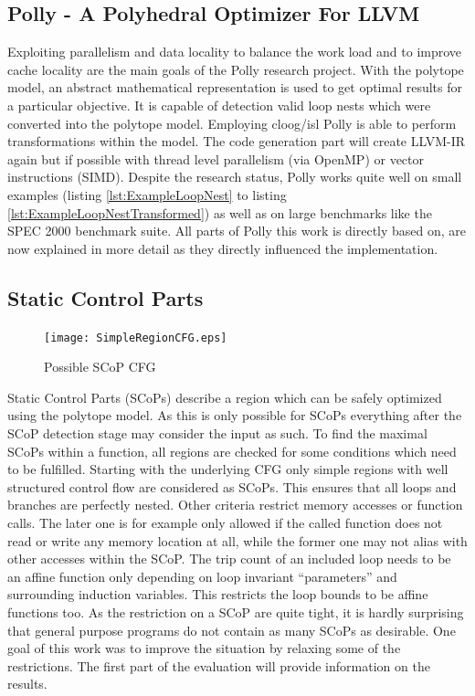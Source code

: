 \orange
\begin{shaded}
\section{Polly - A Polyhedral Optimizer For LLVM}
\label{Polly}
Exploiting parallelism and data locality to balance the work load and to improve
cache locality are the main goals of the Polly research project. With the 
polytope model, an abstract mathematical representation is used to get optimal
results for a particular objective. It is capable of detection valid loop nests 
which were converted into the polytope model. Employing cloog/isl Polly is able to
perform transformations within the model. The code generation part will create 
LLVM-IR again but if possible with thread level parallelism (via OpenMP) or 
vector instructions (SIMD). Despite the research status, Polly works quite well 
on small examples (listing \ref{lst:ExampleLoopNest} to listing 
\ref{lst:ExampleLoopNestTransformed}) as well as on large benchmarks like the
SPEC 2000 benchmark suite. All parts of Polly this work is directly based on, 
are now explained in more detail as they directly influenced the implementation. 


\subsection{Static Control Parts}
\begin{figure}
  \centering
  \vspace*{-3mm}
  \texttt{[image: SimpleRegionCFG.eps]}
  \caption{Possible SCoP CFG}
  \label{fig:PossibleSCoPCFG}  
\end{figure}
Static Control Parts (SCoPs) describe a region which can be safely optimized 
using the polytope model. As this is only possible for SCoPs everything after
the SCoP detection stage may consider the input as such. 
To find the maximal SCoPs within a function, 
all regions are checked for some conditions which need to be fulfilled. 
Starting with the underlying CFG only simple regions with well structured
control flow are considered as SCoPs. This ensures that all loops and branches
are perfectly nested. Other criteria restrict memory accesses or function calls. 
The later one is for example only allowed if the called function does not read
or write any memory location at all, while the former one may not alias with 
other accesses within the SCoP. The trip count of an included loop needs to be
an affine function only depending on loop invariant ``parameters'' and surrounding
induction variables. This restricts the loop bounds to be affine functions too.
As the restriction on a SCoP are quite tight, it is hardly surprising that 
general purpose programs do not contain as many SCoPs as desirable. One goal of
this work was to improve the situation by relaxing some of the restrictions. 
The first part of the evaluation will provide information on the results.

\end{shaded}


